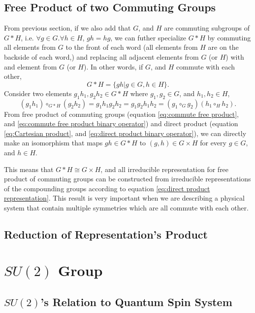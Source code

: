 \documentclass[preprint, 12pt]{revtex4-2}
\numberwithin{equation}{section}
\begin{document}
\subsection{Free Product of two Commuting Groups}
From previous section, if we also add that $G$, and $H$ are commuting subgroups of $G\ast H$, i.e. $\forall g\in G.\forall h\in H$, $gh=hg$, we can  futher specialize $G\ast H$ by commuting all elements from $G$ to the front of each word (all elements from $H$ are on the backside of each word,) and replacing all adjacent elements from $G$ (or $H$) with and element from $G$ (or $H$). In other words, if $G$, and $H$ commute with each other,
\begin{equation}\label{eq:commute free product}
    G\ast H = \{gh|g\in G, h\in H\}.
\end{equation}
Consider two elements $g_1h_1, g_2h_2\in G\ast H$ where $g_1, g_2\in G$, and $h_1, h_2\in H$,
\begin{equation}\label{eq:commute free product binary operator}
    (g_1h_1)\circ_{G\ast H} (g_2h_2) = g_1h_1g_2h_2=g_1g_2h_1h_2=(g_1\circ_Gg_2)(h_1\circ_Hh_2).
\end{equation}
From free product of commuting groups (equation \ref{eq:commute free product}, and \ref{eq:commute free product binary operator}) and direct product (equation \ref{eq:Cartesian product}, and \ref{eq:direct product binary operator}), we can directly make an isomorphism that maps $gh\in G\ast H$ to $(g,h)\in G\times H$ for every $g\in G$, and $h\in H$. 

This means that $G\ast H\cong G\times H$, and all irreducible representation for free product of commuting groups can be constructed from irreducible representations of the compounding groups according to equation \ref{eq:direct product representation}. This result is very important when we are describing a physical system that contain multiple symmetries which are all commute with each other.

\subsection{Reduction of Representation's Product}

\newpage
\section{$SU(2)$ Group}

\subsection{$SU(2)$'s Relation to Quantum Spin System}
\end{document}
